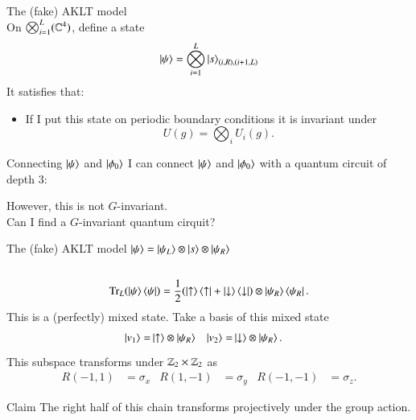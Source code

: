 \documentclass{beamer}
\begin{document}
\begin{frame}{The (fake) AKLT model}
	\\
	On $\bigotimes_{i=1}^L(\mathbb{C}^4)$, define a state
	\begin{equation*}
		\ket{\psi}=\bigotimes_{i=1}^L\ket{s}_{(i,R),(i+1,L)}
	\end{equation*}
	It satisfies that:
	\begin{itemize}
		\item If I put this state on periodic boundary conditions it is invariant under
		\begin{equation*}
			U(g)=\bigotimes_i U_i(g).
		\end{equation*}
	\end{itemize}
\end{frame}


\begin{frame}{Connecting $\ket{\psi}$ and $\ket{\phi_0}$}
	I can connect $\ket{\psi}$ and $\ket{\phi_0}$ with a quantum circuit of depth 3:
	\begin{center}
		\scalebox{0.75}{
		
		}
	\end{center}
	\pause
	However, this is not $G$-invariant.\\
	\pause
	Can I find a $G$-invariant quantum cirquit?
\end{frame}

\begin{frame}{The (fake) AKLT model}
	$\ket{\psi}=\ket{\psi_L}\otimes\ket{s}\otimes\ket{\psi_R}$ \\
	\\
	\pause
	\begin{equation*}
		\textrm{Tr}_L(\ket{\psi}\bra{\psi})=\frac{1}{2}(\ket{\uparrow}\bra{\uparrow}+\ket{\downarrow}\bra{\downarrow})\otimes\ket{\psi_R}\bra{\psi_R}.
	\end{equation*}
	This is a (perfectly) mixed state. Take a basis of this mixed state
	\begin{align*}
		\ket{v_1}=&\ket{\uparrow}\otimes\ket{\psi_R}&\ket{v_2}=&\ket{\downarrow}\otimes\ket{\psi_R}.
	\end{align*}
	\pause
	This subspace transforms under $\mathbb{Z}_2\times\mathbb{Z}_2$ as
	\begin{align*}
		R(-1,1)&=\sigma_x&R(1,-1)&=\sigma_y&R(-1,-1)&=\sigma_z.
	\end{align*}
	\begin{block}{Claim}
		The right half of this chain transforms projectively under the group action.
	\end{block}
\end{frame}
\end{document}
